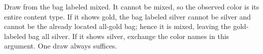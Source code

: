 Draw from the bag labeled mixed. It cannot be mixed, so the observed color is its entire content type. If it shows gold, the bag labeled silver cannot be silver and cannot be the already located all-gold bag; hence it is mixed, leaving the gold-labeled bag all silver. If it shows silver, exchange the color names in this argument. One draw always suffices.
